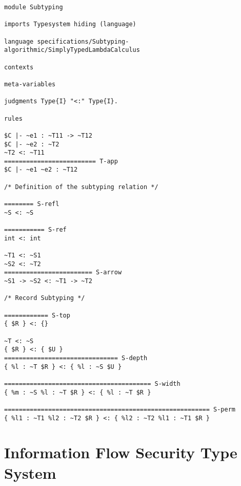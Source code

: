 \begin{lstlisting}[language=sltc]
module Subtyping

imports Typesystem hiding (language)

language specifications/Subtyping-algorithmic/SimplyTypedLambdaCalculus

contexts

meta-variables

judgments Type{I} "<:" Type{I}.

rules

$C |- ~e1 : ~T11 -> ~T12
$C |- ~e2 : ~T2
~T2 <: ~T11
========================= T-app
$C |- ~e1 ~e2 : ~T12

/* Definition of the subtyping relation */

======== S-refl
~S <: ~S

=========== S-ref
int <: int

~T1 <: ~S1
~S2 <: ~T2    
======================== S-arrow 
~S1 -> ~S2 <: ~T1 -> ~T2

/* Record Subtyping */

============ S-top
{ $R } <: {}

~T <: ~S
{ $R } <: { $U }
=============================== S-depth
{ %l : ~T $R } <: { %l : ~S $U }

======================================== S-width
{ %m : ~S %l : ~T $R } <: { %l : ~T $R }

======================================================== S-perm
{ %l1 : ~T1 %l2 : ~T2 $R } <: { %l2 : ~T2 %l1 : ~T1 $R }
\end{lstlisting}

\section{Information Flow Security Type System}
\label{sec:inform-flow-secur}

